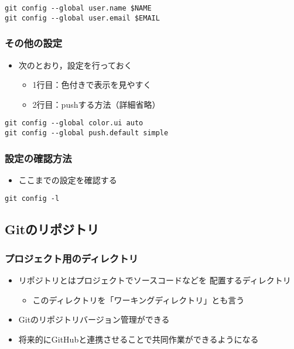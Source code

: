 \documentclass[a4paper,twoside,twocolumn]{bxjsarticle}
\begin{document}
\begin{verbatim}
git config --global user.name $NAME
git config --global user.email $EMAIL
\end{verbatim}

\subsubsection{その他の設定}
\label{sec-1-1-4}
\begin{itemize}
\item 次のとおり，設定を行っておく
\begin{itemize}
\item 1行目：色付きで表示を見やすく
\item 2行目：pushする方法（詳細省略）
\end{itemize}
\end{itemize}

\begin{verbatim}
git config --global color.ui auto
git config --global push.default simple
\end{verbatim}

\subsubsection{設定の確認方法}
\label{sec-1-1-5}
\begin{itemize}
\item ここまでの設定を確認する
\end{itemize}

\begin{verbatim}
git config -l
\end{verbatim}

\subsection{Gitのリポジトリ}
\label{sec-1-2}
\subsubsection{プロジェクト用のディレクトリ}
\label{sec-1-2-1}
\begin{itemize}
\item リポジトリとはプロジェクトでソースコードなどを
配置するディレクトリ
\begin{itemize}
\item このディレクトリを「ワーキングディレクトリ」とも言う
\end{itemize}
\item Gitのリポジトリバージョン管理ができる
\item 将来的にGitHubと連携させることで共同作業ができるようになる
\end{itemize}
\end{document}
